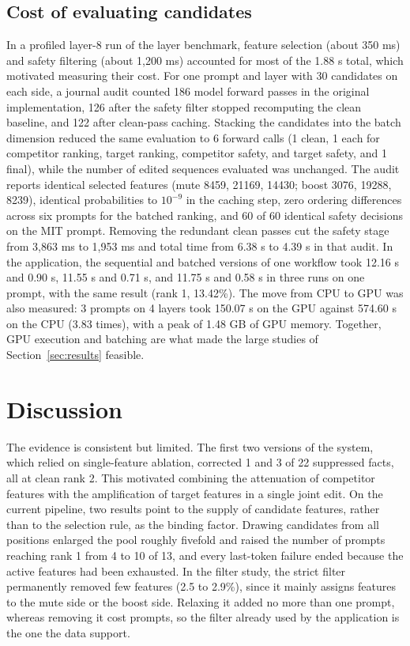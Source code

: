 \documentclass[conference]{IEEEtran}
\begin{document}
\subsection{Cost of evaluating candidates}
\label{sec:compute}
In a profiled layer-8 run of the layer benchmark, feature selection (about 350 ms) and safety filtering (about 1,200 ms) accounted for most of the 1.88 s total, which motivated measuring their cost. For one prompt and layer with 30 candidates on each side, a journal audit counted 186 model forward passes in the original implementation, 126 after the safety filter stopped recomputing the clean baseline, and 122 after clean-pass caching. Stacking the candidates into the batch dimension reduced the same evaluation to 6 forward calls (1 clean, 1 each for competitor ranking, target ranking, competitor safety, and target safety, and 1 final), while the number of edited sequences evaluated was unchanged. The audit reports identical selected features (mute 8459, 21169, 14430; boost 3076, 19288, 8239), identical probabilities to $10^{-9}$ in the caching step, zero ordering differences across six prompts for the batched ranking, and 60 of 60 identical safety decisions on the MIT prompt. Removing the redundant clean passes cut the safety stage from 3,863 ms to 1,953 ms and total time from 6.38 s to 4.39 s in that audit. In the application, the sequential and batched versions of one workflow took 12.16 s and 0.90 s, 11.55 s and 0.71 s, and 11.75 s and 0.58 s in three runs on one prompt, with the same result (rank 1, 13.42\%). The move from CPU to GPU was also measured: 3 prompts on 4 layers took 150.07 s on the GPU against 574.60 s on the CPU (3.83 times), with a peak of 1.48 GB of GPU memory. Together, GPU execution and batching are what made the large studies of Section~\ref{sec:results} feasible.


\section{Discussion}
The evidence is consistent but limited. The first two versions of the system, which relied on single-feature ablation, corrected 1 and 3 of 22 suppressed facts, all at clean rank 2. This motivated combining the attenuation of competitor features with the amplification of target features in a single joint edit. On the current pipeline, two results point to the supply of candidate features, rather than to the selection rule, as the binding factor. Drawing candidates from all positions enlarged the pool roughly fivefold and raised the number of prompts reaching rank 1 from 4 to 10 of 13, and every last-token failure ended because the active features had been exhausted. In the filter study, the strict filter permanently removed few features (2.5 to 2.9\%), since it mainly assigns features to the mute side or the boost side. Relaxing it added no more than one prompt, whereas removing it cost prompts, so the filter already used by the application is the one the data support.
\end{document}
